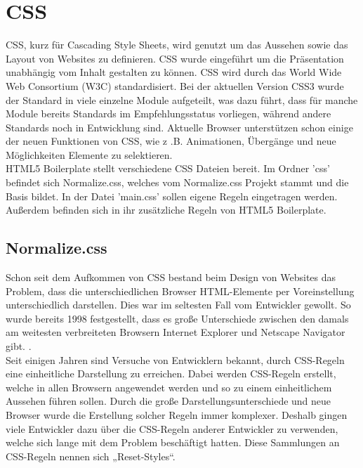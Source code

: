 \documentclass[12pt,journal,compsoc]{IEEEtran}
\begin{document}
\section{CSS}
CSS, kurz für Cascading Style Sheets, wird genutzt um das Aussehen sowie das Layout von Websites zu definieren. CSS wurde eingeführt um die Präsentation unabhängig
vom Inhalt gestalten zu können. CSS wird durch das World Wide Web Consortium (W3C) standardisiert. Bei der aktuellen Version CSS3 wurde der Standard in viele einzelne Module aufgeteilt,
was dazu führt, dass für manche Module bereits Standards im Empfehlungsstatus vorliegen, während andere Standards noch in Entwicklung sind.
Aktuelle Browser unterstützen schon einige der neuen Funktionen von CSS, wie z .B. Animationen, Übergänge und neue Möglichkeiten Elemente zu selektieren.
\\
HTML5 Boilerplate stellt verschiedene CSS Dateien bereit. Im Ordner 'css' befindet sich Normalize.css, welches vom Normalize.css Projekt stammt und die Basis bildet. In der Datei
'main.css' sollen eigene Regeln eingetragen werden. Außerdem befinden sich in ihr zusätzliche Regeln von HTML5 Boilerplate.



\subsection{Normalize.css}

Schon seit dem Aufkommen von CSS bestand beim Design von Websites das Problem, dass die unterschiedlichen Browser HTML-Elemente per Voreinstellung unterschiedlich darstellen.
Dies war im seltesten Fall vom Entwickler gewollt. So wurde bereits 1998 festgestellt, dass es große Unterschiede zwischen den damals am weitesten verbreiteten Browsern
Internet Explorer und Netscape Navigator gibt. \cite{html_prob}. \\ Seit einigen Jahren sind Versuche von Entwicklern bekannt,
durch CSS-Regeln eine einheitliche Darstellung zu erreichen. Dabei werden CSS-Regeln erstellt, welche in allen Browsern angewendet werden
und so zu einem einheitlichem Aussehen führen sollen.
Durch die große Darstellungsunterschiede und neue Browser wurde die Erstellung solcher Regeln immer komplexer.
Deshalb gingen viele Entwickler dazu über die CSS-Regeln anderer Entwickler zu verwenden, welche sich lange mit dem Problem beschäftigt hatten.
Diese Sammlungen an CSS-Regeln nennen sich „Reset-Styles“. 
\end{document}
